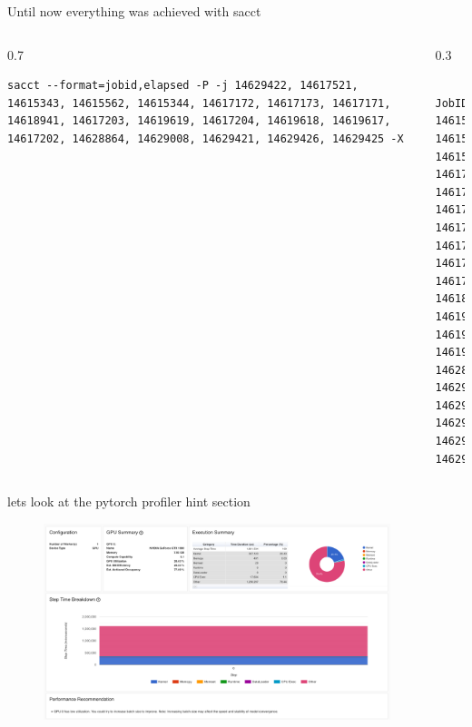 \documentclass[compress,aspectratio=169]{beamer}
\begin{document}
\begin{frame}[fragile]{Until now everything was achieved with sacct}
\begin{columns}
\begin{column}{0.7\textwidth}
        \begin{verbatim}
sacct --format=jobid,elapsed -P -j 14629422, 14617521, 14615343, 14615562, 14615344, 14617172, 14617173, 14617171, 14618941, 14617203, 14619619, 14617204, 14619618, 14619617, 14617202, 14628864, 14629008, 14629421, 14629426, 14629425 -X
        \end{verbatim}
\end{column}

\begin{column}{0.3\textwidth}
    \vspace{-2em}
        \begin{verbatim}
    JobID|Elapsed
14615343|00:11:10
14615344|00:11:22
14615562|00:04:48
14617171|00:06:28
14617172|00:06:22
14617173|00:03:36
14617202|00:04:24
14617203|00:04:19
14617204|00:04:31
14617521|00:01:40
14618941|00:20:02
14619617|00:13:25
14619618|00:08:40
14619619|00:04:06
14628864|01:07:19
14629008|00:06:45
14629421|02:37:14
14629422|01:10:40
14629425|00:13:55
14629426|02:36:55
        \end{verbatim}
\end{column}
\end{columns}

\end{frame}

\begin{frame}{lets look at the pytorch profiler hint section}
	\vspace{-1em}
\begin{center}
    \begin{figure}
        \includegraphics[width=0.9\textwidth]{../../data/scap_gtx1080_profiler-torch_14615562}
    \end{figure}
\end{center}

\end{frame}
\end{document}
